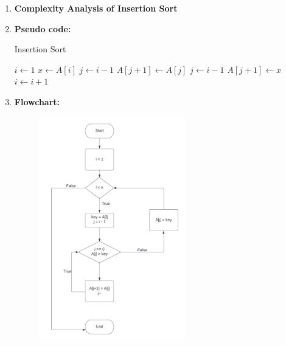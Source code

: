 \documentclass[11pt,a4paper]{article}
\begin{document}
{\begin{enumerate}[label=\textbf{\arabic*})]
				It works similar to the way you sort playing cards in your hands. The array is virtually split into a sorted and an unsorted part. Values from the unsorted part are picked and placed at the correct position in the sorted part.
				\\[12pt]
				\item \textbf{Complexity Analysis of Insertion Sort}
				\\[12pt]
				\item \textbf{Pseudo code:}
				
				\begin{algorithm}
					\caption{Insertion Sort}
					\begin{algorithmic} 
						\STATE $i \leftarrow 1$
						\STATE $x \leftarrow A[i]$
						\STATE $j \leftarrow i - 1$ 
						\STATE $A[j+1] \leftarrow A[j]$
						\STATE $j \leftarrow i - 1$ 
						\ENDWHILE
						\STATE $A[j+1] \leftarrow x$ 
						\STATE $i \leftarrow i + 1$ 
						\ENDWHILE
					\end{algorithmic}
				\end{algorithm}
				\pagebreak
				\item \textbf{Flowchart:}
					\begin{figure}[H]
						\centering 
						\includegraphics[width=0.6\textwidth]{Insertion Sort}
					\end{figure}
					

\end{enumerate}}
\end{document}
